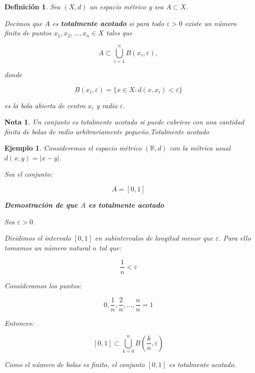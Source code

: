 \documentclass[x11names, 12pt]{book}
\newtheorem{definicion}{Definición}
\newtheorem{example}{Ejemplo}
\newtheorem{remark}{Nota}
\begin{document}
\begin{definicion}
Sea $(X,d)$ un espacio métrico y sea $A \subset X$.

Decimos que $A$ es \textbf{totalmente acotado} si para todo $\varepsilon > 0$
existe un número finito de puntos $x_1, x_2, \dots, x_n \in X$ tales que

\[
A \subset \bigcup_{i=1}^{n} B(x_i,\varepsilon),
\]

donde

\[
B(x_i,\varepsilon) = \{ x \in X : d(x,x_i) < \varepsilon \}
\]

es la bola abierta de centro $x_i$ y radio $\varepsilon$.
\end{definicion}
\begin{remark}
Un conjunto es totalmente acotado si puede cubrirse con
una cantidad finita de bolas de radio arbitrariamente pequeño.Totalmente acotado
\end{remark}
\begin{example}
    Consideremos el espacio métrico $(\mathbb{R}, d)$ con la métrica usual
$d(x,y) = |x-y|$.

Sea el conjunto:

\[
A = [0,1]
\]

\textbf{Demostración de que $A$ es totalmente acotado}

Sea $\varepsilon > 0$.

Dividimos el intervalo $[0,1]$ en subintervalos de longitud menor que
$\varepsilon$. Para ello tomamos un número natural $n$ tal que:

\[
\frac{1}{n} < \varepsilon
\]

Consideramos los puntos:

\[
0, \frac{1}{n}, \frac{2}{n}, \dots, \frac{n}{n} = 1
\]

Entonces:

\[
[0,1] \subset \bigcup_{k=0}^{n} B\left(\frac{k}{n}, \varepsilon\right)
\]

Como el número de bolas es finito, el conjunto $[0,1]$
es totalmente acotado.
\end{example}
\end{document}
